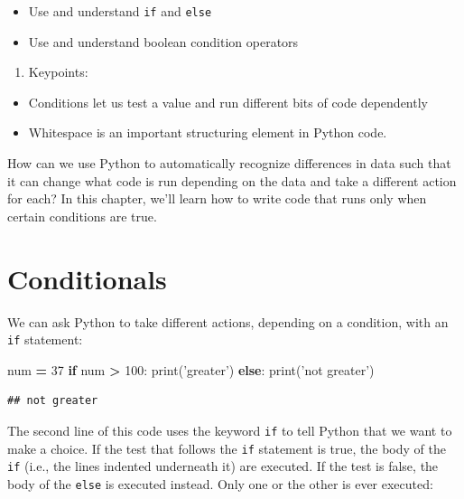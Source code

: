 \documentclass[]{book}
\newenvironment{Shaded}{\begin{snugshade}}{\end{snugshade}}
\newcommand{\BuiltInTok}[1]{#1}
\newcommand{\ControlFlowTok}[1]{\textcolor[rgb]{0.13,0.29,0.53}{\textbf{#1}}}
\newcommand{\DecValTok}[1]{\textcolor[rgb]{0.00,0.00,0.81}{#1}}
\newcommand{\NormalTok}[1]{#1}
\newcommand{\OperatorTok}[1]{\textcolor[rgb]{0.81,0.36,0.00}{\textbf{#1}}}
\newcommand{\StringTok}[1]{\textcolor[rgb]{0.31,0.60,0.02}{#1}}
\providecommand{\tightlist}{%
  \setlength{\itemsep}{0pt}\setlength{\parskip}{0pt}}
\theoremstyle{definition}
\theoremstyle{definition}
\theoremstyle{definition}
\theoremstyle{remark}
\begin{document}
\begin{itemize}
\tightlist
\item
  Use and understand \texttt{if} and \texttt{else}
\item
  Use and understand boolean condition operators
\end{itemize}

\begin{enumerate}
\def\labelenumi{\arabic{enumi}.}
\setcounter{enumi}{2}
\tightlist
\item
  Keypoints:
\end{enumerate}

\begin{itemize}
\tightlist
\item
  Conditions let us test a value and run different bits of code
  dependently
\item
  Whitespace is an important structuring element in Python code.
\end{itemize}

How can we use Python to automatically recognize differences in data
such that it can change what code is run depending on the data and take
a different action for each? In this chapter, we'll learn how to write
code that runs only when certain conditions are true.

\hypertarget{conditionals}{%
\section{Conditionals}\label{conditionals}}

We can ask Python to take different actions, depending on a condition,
with an \texttt{if} statement:

\begin{Shaded}
\begin{Highlighting}[]
\NormalTok{num }\OperatorTok{=} \DecValTok{37}
\ControlFlowTok{if}\NormalTok{ num }\OperatorTok{>} \DecValTok{100}\NormalTok{:}
    \BuiltInTok{print}\NormalTok{(}\StringTok{'greater'}\NormalTok{)}
\ControlFlowTok{else}\NormalTok{:}
    \BuiltInTok{print}\NormalTok{(}\StringTok{'not greater'}\NormalTok{)}
\end{Highlighting}
\end{Shaded}

\begin{verbatim}
## not greater
\end{verbatim}

The second line of this code uses the keyword \texttt{if} to tell Python
that we want to make a choice. If the test that follows the \texttt{if}
statement is true, the body of the \texttt{if} (i.e., the lines indented
underneath it) are executed. If the test is false, the body of the
\texttt{else} is executed instead. Only one or the other is ever
executed:
\end{document}
